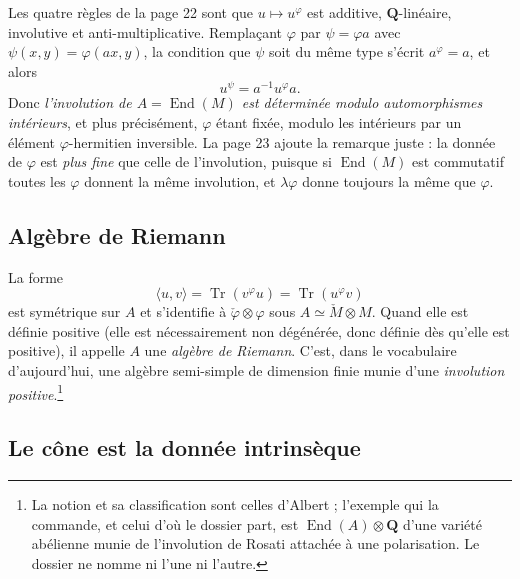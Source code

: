 \documentclass[11pt,a4paper]{article}
\begin{document}
Les quatre règles de la page 22 sont que $u \mapsto u^{\varphi}$ est additive,
$\mathbf{Q}$-linéaire, involutive et anti-multiplicative. Remplaçant $\varphi$
par $\psi = \varphi a$ avec $\psi(x,y) = \varphi(ax,y)$, la condition que
$\psi$ soit du même type s'écrit $a^{\varphi} = a$, et alors
\[
u^{\psi} = a^{-1} u^{\varphi} a .
\]
Donc \emph{l'involution de $A = \operatorname{End}(M)$ est déterminée modulo
automorphismes intérieurs}, et plus précisément, $\varphi$ étant fixée,
modulo les intérieurs par un élément $\varphi$-hermitien inversible. La page 23
ajoute la remarque juste : la donnée de $\varphi$ est \emph{plus fine} que
celle de l'involution, puisque si $\operatorname{End}(M)$ est commutatif toutes
les $\varphi$ donnent la même involution, et $\lambda\varphi$ donne toujours la
même que $\varphi$.

\subsection*{Algèbre de Riemann}

La forme
\[
\langle u, v \rangle = \operatorname{Tr}(v^{\varphi} u) = \operatorname{Tr}(u^{\varphi} v)
\]
est symétrique sur $A$ et s'identifie à $\check{\varphi} \otimes \varphi$ sous
$A \simeq \check{M} \otimes M$. Quand elle est définie positive (elle est
nécessairement non dégénérée, donc définie dès qu'elle est positive), il
appelle $A$ une \emph{algèbre de Riemann}. C'est, dans le vocabulaire
d'aujourd'hui, une algèbre semi-simple de dimension finie munie d'une
\emph{involution positive}.\footnote{La notion et sa classification sont celles
d'Albert ; l'exemple qui la commande, et celui d'où le dossier part, est
$\operatorname{End}(A) \otimes \mathbf{Q}$ d'une variété abélienne munie de
l'involution de Rosati attachée à une polarisation. Le dossier ne nomme ni
l'une ni l'autre.}

\subsection*{Le cône est la donnée intrinsèque}
\end{document}
